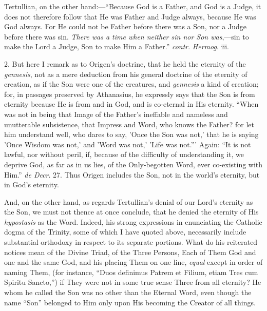 Tertullian, on the other hand:—``Because God is a Father, and
God is a Judge, it does not therefore follow that He was Father and
Judge always, because He was God always. For He could not be
Father before there was a Son, nor a Judge before there was sin. \emph{There
was a time when neither sin nor Son was},—sin to make the Lord a
Judge, Son to make Him a Father.'' \emph{contr}. \emph{Hermog}.
iii.

2. But here I remark as to Origen's doctrine, that he held the
eternity of the \emph{gennesis}, not as a mere deduction from his
general doctrine of the eternity of creation, as if the Son were one
of the creatures, and \emph{gennesis} a kind of creation; for, in
passages preserved by Athanasius, he expressly says that the Son is
from eternity because He is from and in God, and is co-eternal in His
eternity. ``When was not in being that Image of the Father's
ineffable and nameless and unutterable subsistence, that Impress and
Word, who knows the Father? for let him understand well, who dares to
say, 'Once the Son was not,' that he is saying 'Once Wisdom was not,'
and 'Word was not,' 'Life was not.''' Again: ``It is not
lawful, nor without peril, if, because of the difficulty of
understanding it, we deprive God, as far as in us lies, of the
Only-begotten Word, ever co-existing with Him.'' \emph{de Decr}.
27. Thus Origen includes the Son, not in the world's eternity, but in
God's eternity.

And, on the other hand, as regards Tertullian's denial of our Lord's
eternity as the Son, we must not thence at once conclude, that he
denied the eternity of His \emph{hypostasis} as the Word. Indeed, his
strong expressions in enunciating the Catholic dogma of the Trinity,
some of which I have quoted above, necessarily include substantial
orthodoxy in respect to its separate portions. What do his reiterated
notices mean of the Divine Triad, of the Three Persons, Each of
Them God and one and the same God, and his placing Them on one line, \emph{equal}
except in order of naming Them, (for instance, ``Duos definimus
Patrem et Filium, etiam Tres cum Spiritu Sancto,'') if They were
not in some true sense Three from all eternity? He whom he called the
Son was no other than the Eternal Word, even though the name
``Son'' belonged to Him only upon His becoming the Creator of
all things.

